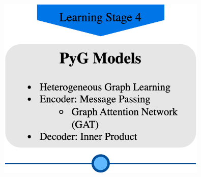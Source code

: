 \documentclass{beamer}
\begin{document}

% 




% 



\begin{frame}
\frametitle{}

\begin{minipage}[c]{0.8\textwidth}
    \hspace{1cm}
    \includegraphics[width=\linewidth]{GNN/imgs/LearningStage4.pdf}
\end{minipage}

\end{frame}
\end{document}
